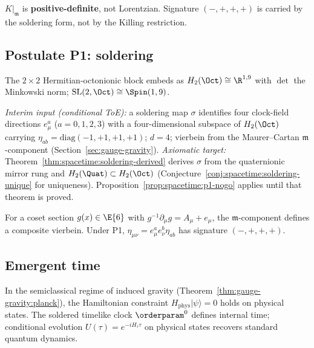\begin{remark}
$K|_{\mathfrak{m}}$ is \textbf{positive-definite}, not Lorentzian. Signature
$(-,+,+,+)$ is carried by the soldering form, not by the Killing restriction.
\end{remark}

\subsection{Postulate P1: soldering}
\label{sec:spacetime:soldering}

The $2\times2$ Hermitian-octonionic block embeds as $H_2(\Oct)\cong\R^{1,9}$
with $\det$ the Minkowski norm; $\mathrm{SL}(2,\Oct)\cong\Spin(1,9)$.

\begin{remark}
\label{post:spacetime:P1}
\emph{Interim input (conditional ToE):} a soldering map $\sigma$ identifies four
clock-field directions $e^a_\mu$ ($a=0,1,2,3$) with a four-dimensional subspace
of $H_2(\Oct)$ carrying $\eta_{ab}=\mathrm{diag}(-1,+1,+1,+1)$; $d=4$; vierbein
from the Maurer--Cartan $\mathfrak{m}$-component
(Section~\ref{sec:gauge-gravity}).
\emph{Axiomatic target:} Theorem~\ref{thm:spacetime:soldering-derived} derives
$\sigma$ from the quaternionic mirror rung and $H_2(\Quat)\subset H_2(\Oct)$
(Conjecture~\ref{conj:spacetime:soldering-unique} for uniqueness).
Proposition~\ref{prop:spacetime:p1-nogo} applies until that theorem is proved.
\end{remark}

\begin{proposition}\label{prop:spacetime:vierbein}
For a coset section $g(x)\in\E{6}$ with $g^{-1}\partial_\mu g=A_\mu+e_\mu$,
the $\mathfrak{m}$-component defines a composite vierbein. Under P1,
$\eta_{\mu\nu}=e^a_\mu e^b_\nu\eta_{ab}$ has signature $(-,+,+,+)$.
\end{proposition}

\subsection{Emergent time}
\label{sec:spacetime:time}

\begin{proposition}\label{prop:spacetime:time}
In the semiclassical regime of induced gravity
(Theorem~\ref{thm:gauge-gravity:planck}), the Hamiltonian constraint
$H_{\mathrm{phys}}|\psi\rangle=0$ holds on physical states. The soldered timelike
clock $\orderparam^0$ defines internal time; conditional evolution
$U(\tau)=e^{-iH_\tau\tau}$ on physical states recovers standard quantum dynamics.
\end{proposition}

